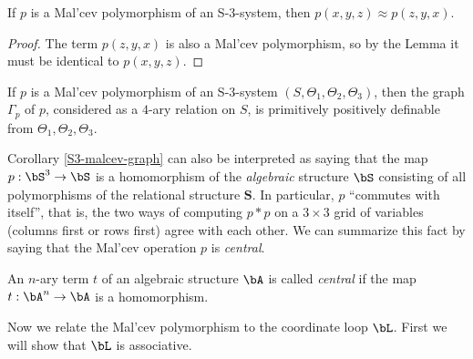 \begin{cor} If $p$ is a Mal'cev polymorphism of an S-3-system, then $p(x,y,z) \approx p(z,y,x)$.
\end{cor}
\begin{proof} The term $p(z,y,x)$ is also a Mal'cev polymorphism, so by the Lemma it must be identical to $p(x,y,z)$.
\end{proof}

\begin{cor}\label{S3-malcev-graph} If $p$ is a Mal'cev polymorphism of an S-3-system $(S,\Theta_1,\Theta_2,\Theta_3)$, then the graph $\Gamma_p$ of $p$, considered as a $4$-ary relation on $S$, is primitively positively definable from $\Theta_1,\Theta_2,\Theta_3$.
\end{cor}

Corollary \ref{S3-malcev-graph} can also be interpreted as saying that the map $p : \bS^3 \rightarrow \bS$ is a homomorphism of the \emph{algebraic} structure $\bS$ consisting of all polymorphisms of the relational structure $\mathbf{S}$. In particular, $p$ ``commutes with itself'', that is, the two ways of computing $p*p$ on a $3\times 3$ grid of variables (columns first or rows first) agree with each other. We can summarize this fact by saying that the Mal'cev operation $p$ is \emph{central}.

\begin{defn} An $n$-ary term $t$ of an algebraic structure $\bA$ is called \emph{central} if the map $t : \bA^n \rightarrow \bA$ is a homomorphism.
\end{defn}

Now we relate the Mal'cev polymorphism to the coordinate loop $\bL$. First we will show that $\bL$ is associative.

